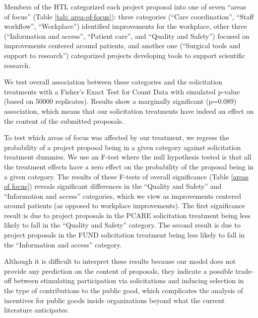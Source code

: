 \documentclass[12pt, titlepage]{article}
\begin{document}
Members of the HTL categorized each project proposal into one of seven
``areas of focus'' (Table \ref{tab: area-of-focus}): three categories
(``Care coordination'', ``Staff workflow'', ``Workplace'') identified
improvements for the workplace, other three (``Information and access'',
``Patient care'', and ``Quality and Safety'') focused on improvements
centered around patients, and another one (``Surgical tools and support
to research'') categorized projects developing tools to support
scientific research.

We test overall association between these categories and the
solicitation treatments with a Fisher's Exact Test for Count Data with
simulated p-value (based on 50000 replicates). Results show a marginally
significant (p=0.089) association, which means that our solicitation
treatments have indeed an effect on the content of the submitted
proposals.

To test which areas of focus was affected by our treatment, we regress
the probability of a project proposal being in a given category against
solicitation treatment dummies. We use an F-test where the null
hypothesis tested is that all the treatment effects have a zero effect
on the probability of the proposal being in a given category. The
results of these F-tests of overall significance (Table
\ref{areas of focus}) reveals significant differences in the ``Quality
and Safety'' and ``Information and access'' categories, which we view as
improvements centered around patients (as opposed to workplace
improvements). The first significance result is due to project proposals
in the PCARE solicitation treatment being less likely to fall in the
``Quality and Safety'' category. The second result is due to project
proposals in the FUND solicitation treatment being less likely to fall
in the ``Information and access'' category.

Although it is difficult to interpret these results because our model
does not provide any prediction on the content of proposals, they
indicate a possible trade-off between stimulating participation via
solicitations and inducing selection in the type of contributions to the
public good, which complicates the analysis of incentives for public
goods inside organizations beyond what the current literature
anticipates.
\end{document}
